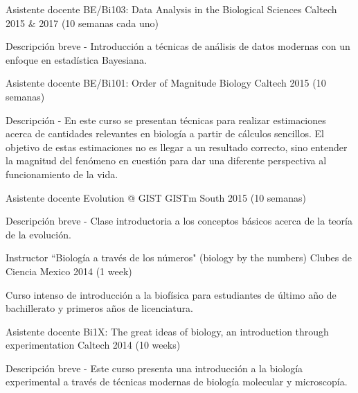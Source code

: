 \begin{cventries}
  \cventry
    {Asistente docente} %
    {BE/Bi103: Data Analysis in the Biological Sciences} %
    {Caltech} %
    {2015 \& 2017 (10 semanas cada uno)} %
    {
      \begin{cvitems} %
        \item {Descripción breve - Introducción a técnicas de análisis de datos
        modernas con un enfoque en estadística Bayesiana.}
      \end{cvitems}
    }

  \cventry
    {Asistente docente} %
    {BE/Bi101: Order of Magnitude Biology} %
    {Caltech} %
    {2015 (10 semanas)} %
    {
      \begin{cvitems} %
        \item {Descripción - En este curso se presentan técnicas para realizar
        estimaciones acerca de cantidades relevantes en biología a partir de
        cálculos sencillos. El objetivo de estas estimaciones no es llegar a un
        resultado correcto, sino entender la magnitud del fenómeno en cuestión
        para dar una diferente perspectiva al funcionamiento de la vida.}
      \end{cvitems}
    }

  \cventry
    {Asistente docente} %
    {Evolution @ GIST} %
    {GISTm South} %
    {2015 (10 semanas)} %
    {
      \begin{cvitems} %
        \item {Descripción breve - Clase introductoria a los conceptos básicos
        acerca de la teoría de la evolución.}
      \end{cvitems}
    }

  \cventry
    {Instructor} %
    {``Biolog\'{i}a a trav\'{e}s de los n\'{u}meros" (biology by the numbers)} 
    {Clubes de Ciencia Mexico} %
    {2014 (1 week)} %
    {
      \begin{cvitems} %
        \item {Curso intenso de introducción a la biofísica para estudiantes de
        último año de bachillerato y primeros años de licenciatura.}
      \end{cvitems}
    }

  \cventry
    {Asistente docente} %
    {Bi1X: The great ideas of biology, an introduction through experimentation}
    {Caltech} %
    {2014 (10 weeks)} %
    {
      \begin{cvitems} %
        \item {Descripción breve - Este curso presenta una introducción a 
        la biología experimental a través de técnicas modernas de biología 
        molecular y microscopía.}
      \end{cvitems}
    }

\end{cventries}
